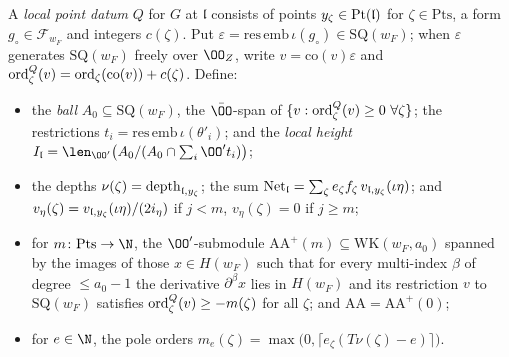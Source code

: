 \begin{definition}\label{pf:onto1:lpd}
A \emph{local point datum} $Q$ for $G$ at $\mathfrak l$ consists of points $y_\zeta\in\operatorname{Pt}(\mathfrak l)$ for
$\zeta\in\mathrm{Pts}$, a form $g_\circ\in\mathcal F_{w_F}$ and integers $c(\zeta)$. Put
$\varepsilon=\mathrm{res}\,\mathrm{emb}\,\iota(g_\circ)\in\mathrm{SQ}(w_F)$; when $\varepsilon$ generates $\mathrm{SQ}(w_F)$ freely over
$\OO_Z$, write $v=\mathrm{co}(v)\varepsilon$ and $\operatorname{ord}^Q_\zeta(v)=\operatorname{ord}_\zeta(\mathrm{co}(v))+c(\zeta)$. Define:
\begin{itemize}
\item the \emph{ball} $A_0\subseteq\mathrm{SQ}(w_F)$, the $\bar\OO$-span of $\{v:\ontooneord^Q_\zeta(v)\ge0\ \forall\zeta\}$; the
restrictions $t_i=\mathrm{res}\,\mathrm{emb}\,\iota(\theta'_i)$; and the \emph{local height}
$I_{\mathfrak l}=\len_{\OO'}\bigl(A_0/(A_0\cap\sum_i\OO't_i)\bigr)$;
\item the depths $\nu(\zeta)=\operatorname{depth}_{\mathfrak l,y_\zeta}$; the sum
$\mathrm{Net}_{\mathfrak l}=\sum_\zeta e_\zeta f_\zeta\,v_{\mathfrak l,y_\zeta}(\iota\eta)$; and
$v_\eta(\zeta)=v_{\mathfrak l,y_\zeta}(\iota\eta)/(2i_\eta)$ if $j<m$, $v_\eta(\zeta)=0$ if $j\ge m$;
\item for $m\colon\mathrm{Pts}\to\N$, the $\OO'$-submodule $\mathrm{AA}^+(m)\subseteq\mathrm{WK}(w_F,a_0)$ spanned by the images of
those $x\in H(w_F)$ such that for every multi-index $\beta$ of degree $\le a_0-1$ the derivative $\partial^\beta x$ lies
in $H(w_F)$ and its restriction $v$ to $\mathrm{SQ}(w_F)$ satisfies $\operatorname{ord}^Q_\zeta(v)\ge-m(\zeta)$ for all $\zeta$; and
$\mathrm{AA}=\mathrm{AA}^+(0)$;
\item for $e\in\N$, the pole orders $m_e(\zeta)=\max\bigl(0,\lceil e_\zeta(T\nu(\zeta)-e)\rceil\bigr)$.
\end{itemize}
\end{definition}

